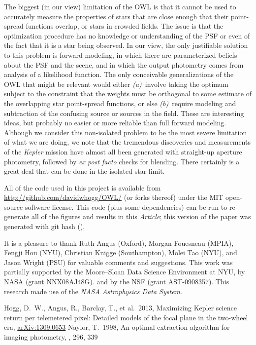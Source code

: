 \documentclass[12pt, letterpaper, preprint]{aastex}
\newcommand{\documentname}{\textsl{Article}}
\newcommand{\project}[1]{\textsl{#1}}
\newcommand{\foreign}[1]{\textsl{#1}}
\newcommand{\etal}{\foreign{et\,al.}}
\begin{document}
The biggest (in our view) limitation of the OWL is that it cannot be used
  to accurately measure the properties of stars
  that are close enough that their point-spread functions overlap,
  or stars in crowded fields.
The issue is that the optimization procedure has no knowledge or understanding
  of the PSF or even of the fact that it is a star being observed.
In our view, the only justifiable solution to this problem is forward modeling,
  in which there are parameterized beliefs about the PSF and the scene,
  and in which the output photometry comes from analysis of a likelihood function.
The only conceivable generalizations of the OWL that might be relevant would either
  \textsl{(a)}~involve taking the optimum subject to the constraint that the weights must be
  orthogonal to some estimate of the overlapping star point-spread functions, or else
  \textsl{(b)}~require modeling and subtraction of the confusing source or sources
  in the field.
These are interesting ideas,
  but probably no easier or more reliable than full forward modeling.
Although we consider this non-isolated problem to be the most severe limitation of what we are doing,
  we note that the tremendous discoveries and measurements of the \project{Kepler} mission
  have almost all been generated with straight-up aperture photometry,
  followed by \foreign{ex post facto} checks for blending.
There certainly is a great deal that can be done in the isolated-star limit.

All of the code used in this project is available
  from \url{http://github.com/davidwhogg/OWL/} (or forks thereof)
  under the MIT open-source software license.
This code (plus some dependencies) can be run
  to re-generate all of the figures and results in this \documentname;
  this version of the paper was generated with git hash
  \texttt{\githash} (\gitdate).

\acknowledgments
It is a pleasure to thank
  Ruth Angus (Oxford),
  Morgan Fouesneau (MPIA),
  Fengji Hou (NYU), 
  Christian Knigge (Southampton),
  Molei Tao (NYU), and
  Jason Wright (PSU)
for valuable comments and suggestions.
This work was partially supported by the Moore--Sloan Data Science Environment at NYU,
  by NASA (grant NNX08AJ48G).
  and by the NSF (grant AST-0908357).
This research made use of the \project{NASA Astrophysics Data System}.

\newcommand{\arxiv}[1]{\href{http://arxiv.org/abs/#1}{arXiv:#1}}
\begin{thebibliography}{}\raggedright
\bibitem[Hogg \etal(2013)]{hoggwhitepaper}
Hogg, D.~W., Angus, R., Barclay, T., et al.\ 2013,
Maximizing Kepler science return per telemetered pixel: Detailed models of the focal plane in the two-wheel era,
\arxiv{1309.0653}
Naylor, T.\ 1998,
An optimal extraction algorithm for imaging photometry,
\mnras, 296, 339
\end{thebibliography}
\end{document}
